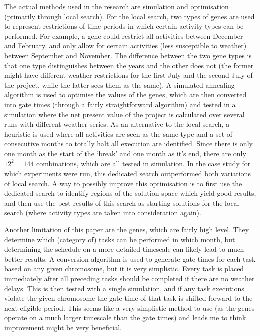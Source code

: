 \documentclass[a4paper,12pt]{article}
\begin{document}
The actual methods used in the research are simulation and optimisation (primarily through local search). For the local search, two types of genes are used to represent restrictions of time periods in which certain activity types can be performed. For example, a gene could restrict all activities between December and February, and only allow for certain activities (less susceptible to weather) between September and November. The difference between the two gene types is that one type distinguishes between the years and the other does not (the former might have different weather restrictions for the first July and the second July of the project, while the latter sees them as the same). A simulated annealing algorithm is used to optimise the values of the genes, which are then converted into gate times (through a fairly straightforward algorithm) and tested in a simulation where the net present value of the project is calculated over several runs with different weather series. As an alternative to the local search, a heuristic is used where all activities are seen as the same type and a set of consecutive months to totally halt all execution are identified. Since there is only one month as the start of the `break' and one month as it's end, there are only $12^2 = 144$ combinations, which are all tested in simulation. In the case study for which experiments were run, this dedicated search outperformed both variations of local search. A way to possibly improve this optimisation is to first use the dedicated search to identify regions of the solution space which yield good results, and then use the best results of this search as starting solutions for the local search (where activity types are taken into consideration again). 

Another limitation of this paper are the genes, which are fairly high level. They determine which (category of) tasks can be performed in which month, but determining the schedule on a more detailed timescale can likely lead to much better results. A conversion algorithm is used to generate gate times for each task based on any given chromosome, but it is very simplistic. Every task is placed immediately after all preceding tasks should be completed if there are no weather delays. This is then tested with a single simulation, and if any task executions violate the given chromosome the gate time of that task is shifted forward to the next eligible period. This seems like a very simplistic method to use (as the genes operate on a much larger timescale than the gate times) and leads me to think improvement might be very beneficial.
\end{document}

